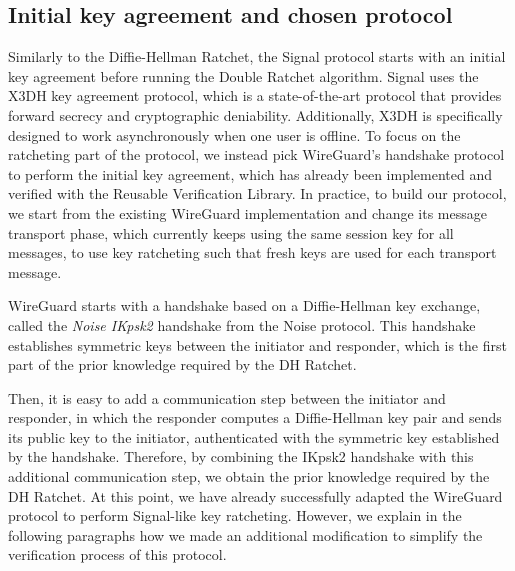 \subsection{Initial key agreement and chosen protocol}
\label{sec:chosen-protocol}

Similarly to the Diffie-Hellman Ratchet, the Signal protocol starts with an initial key agreement before running the Double Ratchet algorithm.
Signal uses the X3DH key agreement protocol, which is a state-of-the-art protocol that provides forward secrecy and cryptographic deniability.
Additionally, X3DH is specifically designed to work asynchronously when one user is offline.
To focus on the ratcheting part of the protocol, we instead pick WireGuard's handshake protocol to perform the initial key agreement, which has already been implemented and verified with the Reusable Verification Library.
In practice, to build our protocol, we start from the existing WireGuard implementation and change its message transport phase, which currently keeps using the same session key for all messages, to use key ratcheting such that fresh keys are used for each transport message.

WireGuard starts with a handshake based on a Diffie-Hellman key exchange, called the \emph{Noise IKpsk2} handshake from the Noise protocol. This handshake establishes symmetric keys between the initiator and responder, which is the first part of the prior knowledge required by the DH Ratchet.

Then, it is easy to add a communication step between the initiator and responder, in which the responder computes a Diffie-Hellman key pair and sends its public key to the initiator, authenticated with the symmetric key established by the handshake.
Therefore, by combining the IKpsk2 handshake with this additional communication step, we obtain the prior knowledge required by the DH Ratchet.
At this point, we have already successfully adapted the WireGuard protocol to perform Signal-like key ratcheting.
However, we explain in the following paragraphs how we made an additional modification to simplify the verification process of this protocol.

